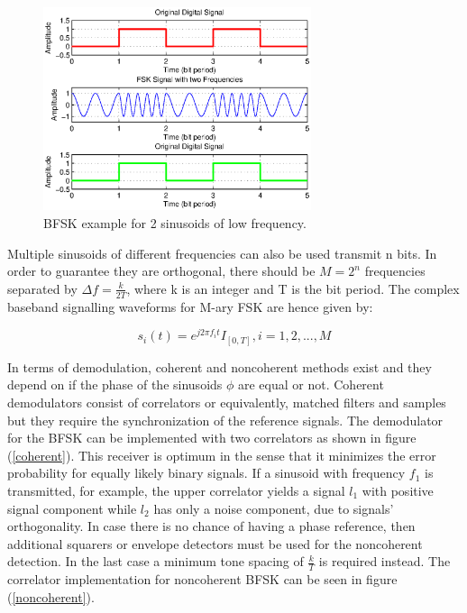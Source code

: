\documentclass[12pt,a4paper,openright]{article}
\begin{document}
\begin{figure}[h]
  \centering
    \includegraphics[width=0.7\textwidth]{fskexample.eps}
    \caption{BFSK example for 2 sinusoids of low frequency.}
    \label{fskex}
\end{figure}

Multiple sinusoids of different frequencies can also be used  transmit n bits. In order to guarantee they are orthogonal, there should be $M=2^n$ frequencies separated by $\Delta f=\frac{k}{2T}$, where k is an integer and T is the bit period. The complex baseband signalling waveforms for M-ary FSK are hence given by:

\[{s_i}(t) = {e^{j2\pi {f_i}t}}{I_{[0,T]}},i = 1,2,...,M\]



In terms of demodulation, coherent and noncoherent methods exist and they depend on if the phase of the sinusoids $\phi$ are equal or not. Coherent demodulators consist of correlators or equivalently, matched filters and samples but they require the synchronization of the reference signals. The demodulator for the BFSK can be implemented with two correlators as shown in figure (\ref{coherent}). This receiver is optimum in the sense that it minimizes the error probability for equally likely binary signals. If a sinusoid with frequency $f_1$ is transmitted, for example, the upper correlator yields a signal $l_1$ with positive signal component while $l_2$ has only a noise component, due to signals’ orthogonality.
  In case there is no chance of having a phase reference, then additional squarers or envelope detectors must be used for the noncoherent detection. In the last case a minimum tone spacing of $\frac{k}{T}$ is required instead. The correlator implementation for noncoherent BFSK can be seen in figure (\ref{noncoherent}).
\end{document}
